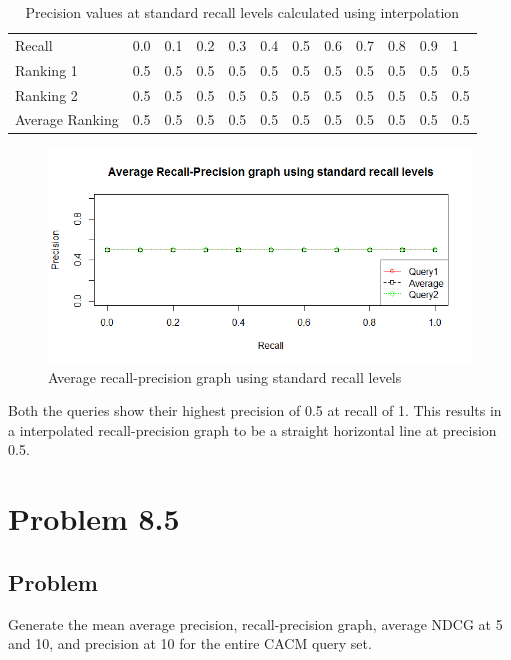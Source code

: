 \documentclass[12pt]{report}
\begin{document}
\begin{table}[]
\centering
\caption{Precision values at standard recall levels calculated using interpolation}
\label{my-label}
\begin{tabular}{llllllllllll}
Recall          & 0.0   & 0.1   & 0.2   & 0.3   & 0.4   & 0.5   & 0.6   & 0.7   & 0.8  & 0.9  & 1    \\
Ranking 1       & 0.5     & 0.5     & 0.5     & 0.5   & 0.5   & 0.5   & 0.5 & 0.5 & 0.5  & 0.5  & 0.5  \\
Ranking 2       & 0.5     & 0.5     & 0.5     & 0.5   & 0.5   & 0.5   & 0.5 & 0.5 & 0.5  & 0.5  & 0.5  \\
Average Ranking  & 0.5     & 0.5     & 0.5     & 0.5   & 0.5   & 0.5   & 0.5 & 0.5 & 0.5  & 0.5  & 0.5  \\
\end{tabular}
\end{table}

\begin{figure}[ht]
  \centering
  \includegraphics[width=1\textwidth]{Problem8_4/Averagerecallprecision.png}
  \caption{Average recall-precision graph using standard recall levels}
  \label{fig:1}
\end{figure}

Both the queries show their highest precision of 0.5 at recall of 1. This results in a interpolated recall-precision graph to be a straight horizontal line at precision 0.5.

\chapter{Problem 8.5}
\section{Problem}
Generate the mean average precision, recall-precision graph, average NDCG at 5 and 10, and precision at 10 for the entire CACM query set.
\end{document}
